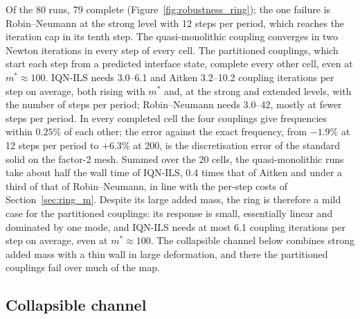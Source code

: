 Of the 80 runs, 79 complete (Figure~\ref{fig:robustness_ring}); the one failure is Robin--Neumann at the strong level with 12 steps per period, which reaches the iteration cap in its tenth step.
The quasi-monolithic coupling converges in two Newton iterations in every step of every cell.
The partitioned couplings, which start each step from a predicted interface state, complete every other cell, even at $m^{*} \approx 100$.
IQN-ILS needs 3.0--6.1 and Aitken 3.2--10.2 coupling iterations per step on average, both rising with $m^{*}$ and, at the strong and extended levels, with the number of steps per period; Robin--Neumann needs 3.0--42, mostly at fewer steps per period.
In every completed cell the four couplings give frequencies within $0.25\%$ of each other; the error against the exact frequency, from $-1.9\%$ at 12 steps per period to $+6.3\%$ at 200, is the discretisation error of the standard solid on the factor-2 mesh.
Summed over the 20 cells, the quasi-monolithic runs take about half the wall time of IQN-ILS, 0.4 times that of Aitken and under a third of that of Robin--Neumann, in line with the per-step costs of Section~\ref{sec:ring_m}.
Despite its large added mass, the ring is therefore a mild case for the partitioned couplings: its response is small, essentially linear and dominated by one mode, and IQN-ILS needs at most 6.1 coupling iterations per step on average, even at $m^{*} \approx 100$.
The collapsible channel below combines strong added mass with a thin wall in large deformation, and there the partitioned couplings fail over much of the map.

\subsection{Collapsible channel}\label{sec:robustness_collapsible}


